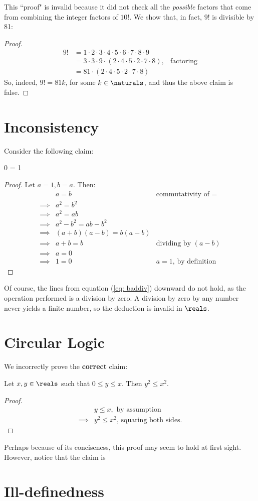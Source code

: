 \documentclass[../proofs.tex]{subfiles}
\begin{document}
This ``proof" is invalid because it did not check all the \emph{possible}
factors that come from combining the integer factors of $10!$. We show
that, in fact, $9!$ is divisible by 81:
\begin{proof}
  \begin{align}
    9! &= 1 \cdot 2 \cdot 3 \cdot 4 \cdot 5 \cdot 6 \cdot 7 \cdot 8 \cdot 9 \\
       &= 3 \cdot 3 \cdot 9 \cdot (2 \cdot 4 \cdot 5 \cdot 2 \cdot 7 \cdot 8),
        & \text{factoring}\\
       &= 81 \cdot (2 \cdot 4 \cdot 5 \cdot 2 \cdot 7 \cdot 8)
  \end{align}
  So, indeed, $9! = 81k$, for some $k \in \naturals$, and thus the above
  claim is false.
\end{proof}

\section{Inconsistency}
Consider the following claim:

\begin{claim}
  0 = 1
\end{claim}
\begin{proof}
  Let $a = 1, b = a$. Then:
  \begin{align}
    &a = b & \text{commutativity of $=$} \\
    \implies &a^2 = b^2 \\
    \implies &a^2 = ab  \\
    \implies &a^2 - b^2 = ab - b^2 \\
    \implies &(a + b)(a - b) = b(a - b) \\
    \implies &a + b = b & \text{dividing by $(a-b)$} \label{eq: baddiv} \\
    \implies &a = 0 \\
    \implies &1 = 0 & \text{$a = 1$, by definition}
  \end{align}
\end{proof}

Of course, the lines from equation (\ref{eq: baddiv}) downward do not hold, as
the operation performed is a division by zero. A division by zero by any number
never yields a finite number, so the deduction is invalid in $\reals$.

\section{Circular Logic}
We incorrectly prove the \textbf{correct} claim:
\begin{claim}
  Let $x, y \in \reals$ such that $0 \leq y \leq x$. Then $y^2 \leq x^2$.
\end{claim}
\begin{proof}
  \begin{align}
    &y \leq x, \text{ by assumption} \label{eq: sqassump} \\
    \implies &y^2 \leq x^2 \text{, squaring both sides.} \label{eq: sqconseq}
  \end{align}
\end{proof}

Perhaps because of its conciseness, this proof may seem to hold at first sight.
However, notice that the claim is 

\section{Ill-definedness}
\end{document}
